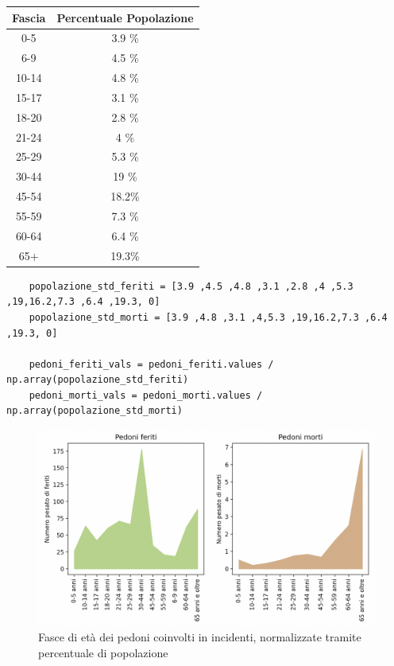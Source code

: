 \documentclass[a4paper]{report}
\begin{document}
\begin{center}
    \def\arraystretch{1.5}%
    \begin{tabular}{ |c|c| } 
    \hline
    Fascia & Percentuale Popolazione \\ 
    \hline
    \rowcolor{TableGray}
    0-5     & 3.9 \% \\ 
    6-9     & 4.5 \% \\
    \rowcolor{TableGray}
    10-14   & 4.8 \% \\
    15-17   & 3.1 \% \\
    \rowcolor{TableGray}
    18-20   & 2.8 \% \\ 
    21-24   & 4   \% \\
    \rowcolor{TableGray}
    25-29   & 5.3 \% \\
    30-44   & 19  \% \\
    \rowcolor{TableGray}
    45-54   & 18.2\% \\ 
    55-59   & 7.3 \% \\
    \rowcolor{TableGray}
    60-64   & 6.4 \% \\
    65$+$   & 19.3\% \\
    \hline
    \end{tabular}
\end{center}

\begin{lstlisting}
    popolazione_std_feriti = [3.9 ,4.5 ,4.8 ,3.1 ,2.8 ,4 ,5.3 ,19,16.2,7.3 ,6.4 ,19.3, 0]
    popolazione_std_morti = [3.9 ,4.8 ,3.1 ,4,5.3 ,19,16.2,7.3 ,6.4 ,19.3, 0]

    pedoni_feriti_vals = pedoni_feriti.values / np.array(popolazione_std_feriti)
    pedoni_morti_vals = pedoni_morti.values / np.array(popolazione_std_morti)
\end{lstlisting}

\begin{figure}
    \includegraphics[width=\linewidth]{../src/incidenti/incidenti_senza_coords/pedoni/eta_pedoni_norm.png}
    \caption{Fasce di età dei pedoni coinvolti in incidenti, normalizzate tramite percentuale di popolazione}
    \label{fig:eta-pedoni-norm}
\end{figure}
\end{document}
